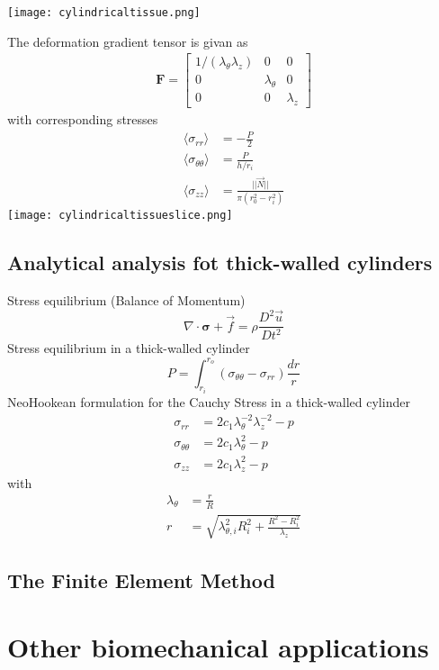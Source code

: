 \documentclass[../main.tex]{subfiles}
\begin{document}
\texttt{[image: cylindricaltissue.png]}

The deformation gradient tensor is givan as
\begin{align}
    \textbf{F} = \left[\begin{matrix}
        1/(\lambda_{\theta}\lambda_z) & 0 & 0 \\
        0 & \lambda_{\theta} & 0 \\
        0 & 0 & \lambda_z
    \end{matrix}\right]
\end{align}
with corresponding stresses
\begin{align}
    \langle \sigma_{rr} \rangle &= -\frac{P}{2} \\
    \langle \sigma_{\theta\theta} \rangle &= \frac{P}{h/r_i}\\
    \langle \sigma_{zz} \rangle &= \frac{||\vec{N}||}{\pi(r^2_0-r^2_i)}
\end{align}
\texttt{[image: cylindricaltissueslice.png]}

\subsection{Analytical analysis fot thick-walled cylinders}

Stress equilibrium (Balance of Momentum)
\begin{equation}
    \nabla \cdot \bm{\sigma} + \vec{f} = \rho \frac{D^2\vec{u}}{Dt^2}
\end{equation}
Stress equilibrium in a thick-walled cylinder
\begin{equation}
    P = \int_{r_i}^{r_o}(\sigma_{\theta\theta}-\sigma_{rr})\frac{dr}{r}
\end{equation}
NeoHookean formulation for the Cauchy Stress in a thick-walled cylinder
\begin{align}
    \sigma_{rr} & = 2c_1\lambda_{\theta}^{-2}\lambda_z^{-2}-p \\
    \sigma_{\theta\theta} & = 2c_1\lambda_{\theta}^{2}-p \\
    \sigma_{zz} & = 2c_1\lambda_z^{2}-p
\end{align}
with
\begin{align}
    \lambda_{\theta} & = \frac{r}{R}\\
    r & = \sqrt{\lambda_{\theta, i}^2R_i^2+\frac{R^2-R_i^2}{\lambda_z}}
\end{align}

\subsection{The Finite Element Method}

\section{Other biomechanical applications}
\end{document}

